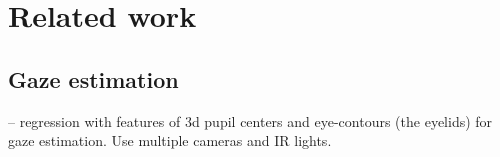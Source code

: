 
\section{Related work}

\subsection{Gaze estimation}

\cite{xiong2014gaze} -- regression with features of 3d pupil centers and eye-contours (the eyelids) for gaze estimation.  Use multiple cameras and IR lights.